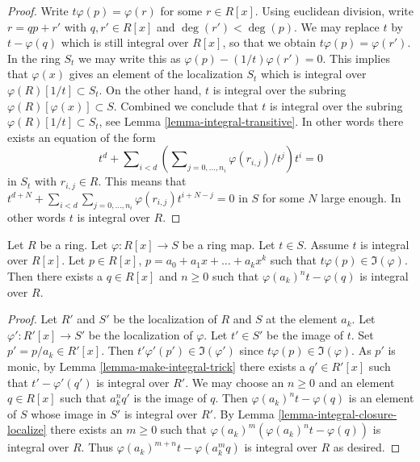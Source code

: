 \begin{proof}
Write $t \varphi(p) = \varphi(r)$ for some $r \in R[x]$.
Using euclidean division, write $r = qp + r'$ with
$q, r' \in R[x]$ and $\deg(r') < \deg(p)$. We may replace
$t$ by $t - \varphi(q)$ which is still integral over
$R[x]$, so that we obtain $t \varphi(p) = \varphi(r')$.
In the ring $S_t$ we may write this as
$\varphi(p) - (1/t) \varphi(r') = 0$.
This implies that $\varphi(x)$ gives an element of the
localization $S_t$ which is integral over
$\varphi(R)[1/t] \subset S_t$. On the other hand,
$t$ is integral over the subring $\varphi(R)[\varphi(x)] \subset S$.
Combined we conclude that $t$ is integral over
the subring $\varphi(R)[1/t] \subset S_t$, see Lemma
\ref{lemma-integral-transitive}. In other words
there exists an equation of the form
$$
t^d + \sum\nolimits_{i < d}
\left(\sum\nolimits_{j = 0, \ldots, n_i} \varphi(r_{i, j})/t^j\right) t^i = 0
$$
in $S_t$ with $r_{i, j} \in R$. This means that
$t^{d + N} +
\sum_{i < d} \sum_{j = 0, \ldots, n_i} \varphi(r_{i, j}) t^{i + N - j} = 0$
in $S$ for some $N$ large enough. In other words
$t$ is integral over $R$.
\end{proof}

\begin{lemma}
\label{lemma-combine-lemmas}
Let $R$ be a ring. Let $\varphi : R[x] \to S$ be
a ring map. Let $t \in S$. Assume $t$ is integral
over $R[x]$. Let $p \in R[x]$, $p = a_0 + a_1x + \ldots +
a_k x^k$ such that $t \varphi(p) \in \Im(\varphi)$.
Then there exists a $q \in R[x]$ and $n \geq 0$
such that $\varphi(a_k)^n t - \varphi(q)$ is integral
over $R$.
\end{lemma}

\begin{proof}
Let $R'$ and $S'$ be the localization of $R$ and $S$ at the element $a_k$.
Let $\varphi' : R'[x] \to S'$ be the localization of $\varphi$.
Let $t' \in S'$ be the image of $t$. Set $p' = p/a_k \in R'[x]$.
Then $t' \varphi'(p') \in \Im(\varphi')$ since $t \varphi(p) \in \Im(\varphi)$.
As $p'$ is monic, by
Lemma \ref{lemma-make-integral-trick} there exists a $q' \in R'[x]$
such that $t' - \varphi'(q')$ is integral over $R'$.
We may choose an $n \geq 0$ and an element $q \in R[x]$
such that $a_k^n q'$ is the image of $q$.
Then $\varphi(a_k)^n t - \varphi(q)$ is an element of $S$ whose
image in $S'$ is integral over $R'$.
By Lemma \ref{lemma-integral-closure-localize}
there exists an $m \geq 0$ such that
$\varphi(a_k)^m(\varphi(a_k)^n t - \varphi(q))$ is integral over $R$.
Thus $\varphi(a_k)^{m + n}t - \varphi(a_k^m q)$
is integral over $R$ as desired.
\end{proof}

